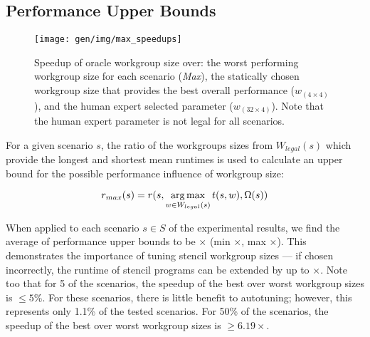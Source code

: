 \begin{table}
  \parbox{.45\linewidth}{
    \centering
    \scriptsize
    
    \caption{%
      The 25 workgroup sizes with the greatest legality.%
    }
\label{tab:highest-legality}
  }
  \hfill
  \parbox{.45\linewidth}{
    \centering
    \scriptsize
    
    \caption{%
      The 25 workgroup sizes with the greatest mean
      performance.%
    }
\label{tab:highest-performance}
  }
\end{table}


\subsection{Performance Upper Bounds}

\begin{figure}
  \texttt{[image: gen/img/max\_speedups]}
  \caption{%
    Speedup of oracle workgroup size over: the worst performing
    workgroup size for each scenario (\emph{Max}), the statically
    chosen workgroup size that provides the best overall performance
    ($w_{(4 \times 4)}$), and the human expert selected parameter
    ($w_{(32 \times 4)}$). Note that the human expert parameter is not
    legal for all scenarios.%
  }
\label{fig:speedups}
\end{figure}

For a given scenario $s$, the ratio of the workgroups sizes from
$W_{legal}(s)$ which provide the longest and shortest mean runtimes is
used to calculate an upper bound for the possible performance
influence of workgroup size:

\begin{equation}
r_{max}(s) = r(s, \operatorname*{arg\,max}_{w \in W_{legal}(s)} t(s,w), \Omega(s))
\end{equation}

When applied to each scenario $s \in S$ of the experimental results,
we find the average of performance upper bounds to be
$\times$ (min
$\times$, max
$\times$). This demonstrates the
importance of tuning stencil workgroup sizes --- if chosen
incorrectly, the runtime of stencil programs can be extended by up to
$\times$. Note too that for 5 of the
scenarios, the speedup of the best over worst workgroup sizes is
$\le 5\%$.
For these scenarios, there is little benefit to autotuning; however,
this represents only 1.1\% of the tested scenarios. For 50\% of the
scenarios, the speedup of the best over worst workgroup sizes is
$\ge 6.19\times$.


